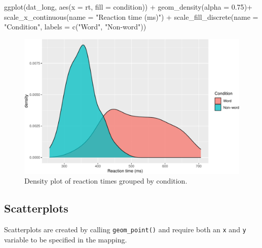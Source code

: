 \documentclass[
  english,
  doc,floatsintext]{apa6}
\newenvironment{Shaded}{\begin{snugshade}}{\end{snugshade}}
\newcommand{\AttributeTok}[1]{\textcolor[rgb]{0.77,0.63,0.00}{#1}}
\newcommand{\FloatTok}[1]{\textcolor[rgb]{0.00,0.00,0.81}{#1}}
\newcommand{\FunctionTok}[1]{\textcolor[rgb]{0.00,0.00,0.00}{#1}}
\newcommand{\NormalTok}[1]{#1}
\newcommand{\SpecialCharTok}[1]{\textcolor[rgb]{0.00,0.00,0.00}{#1}}
\newcommand{\StringTok}[1]{\textcolor[rgb]{0.31,0.60,0.02}{#1}}
\begin{document}
\begin{Shaded}
\begin{Highlighting}[]
\FunctionTok{ggplot}\NormalTok{(dat\_long, }\FunctionTok{aes}\NormalTok{(}\AttributeTok{x =}\NormalTok{ rt, }\AttributeTok{fill =}\NormalTok{ condition)) }\SpecialCharTok{+}
  \FunctionTok{geom\_density}\NormalTok{(}\AttributeTok{alpha =} \FloatTok{0.75}\NormalTok{)}\SpecialCharTok{+}
  \FunctionTok{scale\_x\_continuous}\NormalTok{(}\AttributeTok{name =} \StringTok{"Reaction time (ms)"}\NormalTok{) }\SpecialCharTok{+}
  \FunctionTok{scale\_fill\_discrete}\NormalTok{(}\AttributeTok{name =} \StringTok{"Condition"}\NormalTok{,}
                      \AttributeTok{labels =} \FunctionTok{c}\NormalTok{(}\StringTok{"Word"}\NormalTok{, }\StringTok{"Non{-}word"}\NormalTok{))}
\end{Highlighting}
\end{Shaded}

\begin{figure}

{\centering \includegraphics[width=1\linewidth]{images/density-grouped-1} 

}

\caption{Density plot of reaction times grouped by condition.}\label{fig:density-grouped}
\end{figure}

\hypertarget{scatterplots}{%
\subsection{Scatterplots}\label{scatterplots}}

Scatterplots are created by calling \texttt{geom\_point()} and require both an \texttt{x} and \texttt{y} variable to be specified in the mapping.
\end{document}
